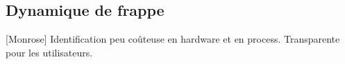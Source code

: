 \subsection{Dynamique de frappe}
[Monrose] Identification peu coûteuse en hardware et en process. Transparente pour les utilisateurs.



